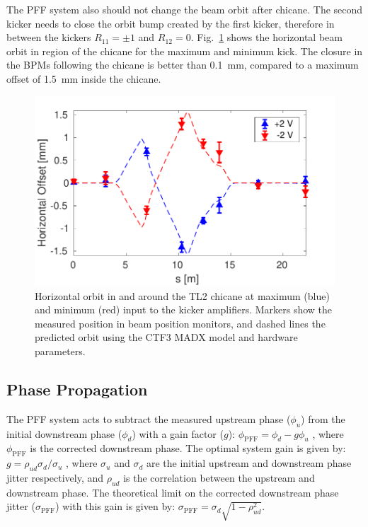 \documentclass[%
 reprint,
superscriptaddress,
 amsmath,amssymb,
 prl,
]{revtex4-1}
\begin{document}
The PFF system also should not change the beam orbit after 
chicane. The second kicker needs to close the orbit bump created by 
the first kicker, therefore in between the kickers
\(R_{11}=\pm 1\) and \(R_{12}=0\). Fig.~\ref{fig:orbClos} shows the horizontal beam orbit in 
region of the chicane for the maximum and minimum kick. The closure in 
the BPMs following the chicane is better than 0.1~mm, compared to a maximum 
offset of 1.5~mm inside the chicane.

\begin{figure}
	\includegraphics[width=\columnwidth]{figs/orbClos}
	\caption{\label{fig:orbClos}Horizontal orbit in and around the TL2 chicane 
	at maximum (blue) and 
	minimum (red) 
	input to the kicker amplifiers. Markers show the measured position in beam 
	position monitors, and dashed lines the predicted orbit using the 
	CTF3 MADX model and hardware parameters.}
\end{figure}


\subsection{\label{ss:r56} Phase Propagation}

The PFF system acts to subtract the measured upstream phase (\(\phi_u\)) from 
the initial downstream phase (\(\phi_d\)) with a gain factor (\(g\)):
\(\phi_{\mathrm{PFF}} = \phi_d - g\phi_u\)
, where \(\phi_{\mathrm{PFF}}\) is the corrected downstream phase. The optimal 
system gain is given by:
\(g = \rho_{ud} \sigma_d/\sigma_u\)
, where \(\sigma_u\) and \(\sigma_d\) are the initial upstream and downstream 
phase jitter respectively, and \(\rho_{ud}\) is the correlation between the 
upstream and downstream phase. The theoretical limit on the corrected 
downstream phase jitter (\(\sigma_{\mathrm{PFF}}\)) with this gain is given by:
\(\sigma_{\mathrm{PFF}}=\sigma_d \sqrt{1-\rho_{ud}^2}\). 
\end{document}
